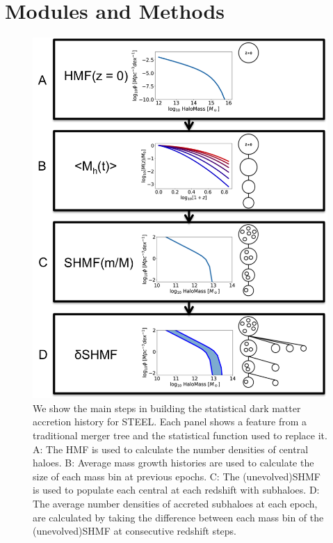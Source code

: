 \section{Modules and Methods}
\begin{figure}[h]
	\centering
	\includegraphics[width = \linewidth]{Figures/Chapter2/StatDM.png}
    \caption{We show the main steps in building the statistical dark matter accretion history for STEEL. Each panel shows a feature from a traditional merger tree and the statistical function used to replace it. A: The HMF is used to calculate the number densities of central haloes. B: Average mass growth histories are used to calculate the size of each mass bin at previous epochs. C: The (unevolved)SHMF is used to populate each central at each redshift with subhaloes. D: The average number densities of accreted subhaloes at each epoch, are calculated by taking the difference between each mass bin of the (unevolved)SHMF at consecutive redshift steps.}
	\label{fig:StatDM}
\end{figure}



